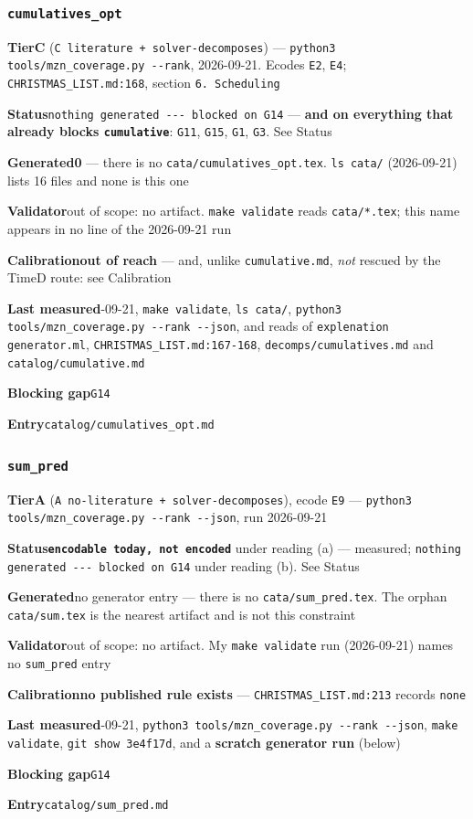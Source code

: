 \documentclass[10pt,a4paper]{article}
\newcommand{\entryfield}[2]{{\raggedright\textbf{#1}\quad #2\par}}
\begin{document}
\subsubsection*{\texttt{cumulatives\_\allowbreak{}opt}}
\label{entry:cumulatives-opt}
\entryfield{Tier}{\textbf{C} (\texttt{C literature + solver-\allowbreak{}decomposes}) --- \texttt{python3 tools/\allowbreak{}mzn\_\allowbreak{}coverage.\allowbreak{}py -\allowbreak{}-\allowbreak{}rank}, 2026-09-21. Ecodes \texttt{E2}, \texttt{E4}; \texttt{CHRISTMAS\_LIST.md:168}, section \texttt{6. Scheduling}}
\entryfield{Status}{\texttt{nothing generated -\allowbreak{}-\allowbreak{}-\allowbreak{} blocked on G14} --- \textbf{and on everything that already blocks \texttt{cumulative}}: \texttt{G11}, \texttt{G15}, \texttt{G1}, \texttt{G3}. See Status}
\entryfield{Generated}{\textbf{0} --- there is no \texttt{cata/cumulatives\_opt.tex}. \texttt{ls cata/} (2026-09-21) lists 16 files and none is this one}
\entryfield{Validator}{out of scope: no artifact. \texttt{make validate} reads \texttt{cata/*.tex}; this name appears in no line of the 2026-09-21 run}
\entryfield{Calibration}{\textbf{out of reach} --- and, unlike \texttt{cumulative.md}, \emph{not} rescued by the TimeD route: see Calibration}
\entryfield{Last measured}{2026-09-21, \texttt{make validate}, \texttt{ls cata/}, \texttt{python3 tools/\allowbreak{}mzn\_\allowbreak{}coverage.\allowbreak{}py -\allowbreak{}-\allowbreak{}rank -\allowbreak{}-\allowbreak{}json}, and reads of \texttt{explenation generator.ml}, \texttt{CHRISTMAS\_\allowbreak{}LIST.\allowbreak{}md:167-\allowbreak{}168}, \texttt{decomps/cumulatives.md} and \texttt{catalog/cumulative.md}}
\entryfield{Blocking gap}{\texttt{G14}}
\entryfield{Entry}{\texttt{catalog/cumulatives\_opt.md}}
\subsubsection*{\texttt{sum\_\allowbreak{}pred}}
\label{entry:sum-pred}
\entryfield{Tier}{\textbf{A} (\texttt{A no-\allowbreak{}literature + solver-\allowbreak{}decomposes}), ecode \texttt{E9} --- \texttt{python3 tools/\allowbreak{}mzn\_\allowbreak{}coverage.\allowbreak{}py -\allowbreak{}-\allowbreak{}rank -\allowbreak{}-\allowbreak{}json}, run 2026-09-21}
\entryfield{Status}{\textbf{\texttt{encodable today, not encoded}} under reading (a) --- measured; \texttt{nothing generated -\allowbreak{}-\allowbreak{}-\allowbreak{} blocked on G14} under reading (b). See Status}
\entryfield{Generated}{no generator entry --- there is no \texttt{cata/sum\_pred.tex}. The orphan \texttt{cata/sum.tex} is the nearest artifact and is not this constraint}
\entryfield{Validator}{out of scope: no artifact. My \texttt{make validate} run (2026-09-21) names no \texttt{sum\_pred} entry}
\entryfield{Calibration}{\textbf{no published rule exists} --- \texttt{CHRISTMAS\_LIST.md:213} records \texttt{none}}
\entryfield{Last measured}{2026-09-21, \texttt{python3 tools/\allowbreak{}mzn\_\allowbreak{}coverage.\allowbreak{}py -\allowbreak{}-\allowbreak{}rank -\allowbreak{}-\allowbreak{}json}, \texttt{make validate}, \texttt{git show 3e4f17d}, and a \textbf{scratch generator run} (below)}
\entryfield{Blocking gap}{\texttt{G14}}
\entryfield{Entry}{\texttt{catalog/sum\_pred.md}}
\end{document}
